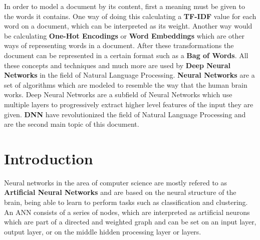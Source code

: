 \documentclass{scrartcl}
\begin{document}
    In order to model a document by its content, first a meaning must be given to the words it
    contains. \newline 
    One way of doing this calculating a \textbf{TF-IDF} value for each word on a
    document, which can be interpreted as its weight. Another way would be calculating
    \textbf{One-Hot Encodings} or \textbf{Word Embeddings} which are other ways 
    of representing words in a document.
    After these transformations the document can be represented in a certain format
    such as a \textbf{Bag of Words}. \newline 
    All these concepts and techniques and much more are used by \textbf{Deep Neural Networks} in 
    the field of Natural Language Processing. \textbf{Neural Networks} are a set of algorithms 
    which are modeled to resemble the way that the human brain works. Deep Neural Networks
    are a subfield of Neural Networks which use multiple layers to progressively extract 
    higher level features of the input they are given. \textbf{DNN} have revolutionized the field
    of Natural Language Processing and are the second main topic of this document. 
    \newpage
    \section{ Introduction }
    Neural networks in the area of computer science are mostly refered to as 
    \textbf{Artificial Neural Networks} and are based on the neural structure of the brain,
    being able to learn to perform tasks such as classification and clustering. \newline
    An ANN consists of a series of nodes, which are interpreted as artificial neurons which
    are part of a directed and weighted graph and can be set on an input layer, 
    output layer, or on the middle hidden processing layer or layers.
    
\end{document}
